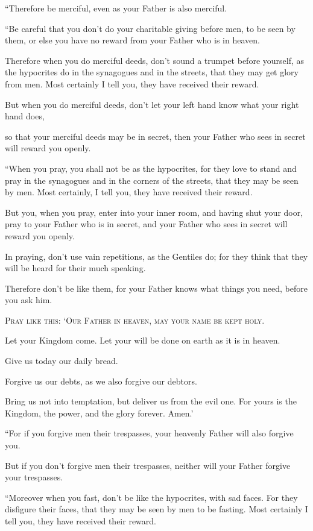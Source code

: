 “Therefore be merciful, even as your Father is also merciful.

“Be careful that you don’t do your charitable giving before men, to be seen by them, or else you have no reward from your Father who is in heaven.

Therefore when you do merciful deeds, don’t sound a trumpet before yourself, as the hypocrites do in the synagogues and in the streets, that they may get glory from men. Most certainly I tell you, they have received their reward.

But when you do merciful deeds, don’t let your left hand know what your right hand does,

so that your merciful deeds may be in secret, then your Father who sees in secret will reward you openly.

“When you pray, you shall not be as the hypocrites, for they love to stand and pray in the synagogues and in the corners of the streets, that they may be seen by men. Most certainly, I tell you, they have received their reward.

But you, when you pray, enter into your inner room, and having shut your door, pray to your Father who is in secret, and your Father who sees in secret will reward you openly.

In praying, don’t use vain repetitions, as the Gentiles do; for they think that they will be heard for their much speaking.

Therefore don’t be like them, for your Father knows what things you need, before you ask him.

\lettrine{P}{ray like this: ‘Our Father in heaven, may your name be kept holy.}

Let your Kingdom come. Let your will be done on earth as it is in heaven.

Give us today our daily bread.

Forgive us our debts, as we also forgive our debtors.

Bring us not into temptation, but deliver us from the evil one. For yours is the Kingdom, the power, and the glory forever. Amen.’

“For if you forgive men their trespasses, your heavenly Father will also forgive you.

But if you don’t forgive men their trespasses, neither will your Father forgive your trespasses.

“Moreover when you fast, don’t be like the hypocrites, with sad faces. For they disfigure their faces, that they may be seen by men to be fasting. Most certainly I tell you, they have received their reward.

